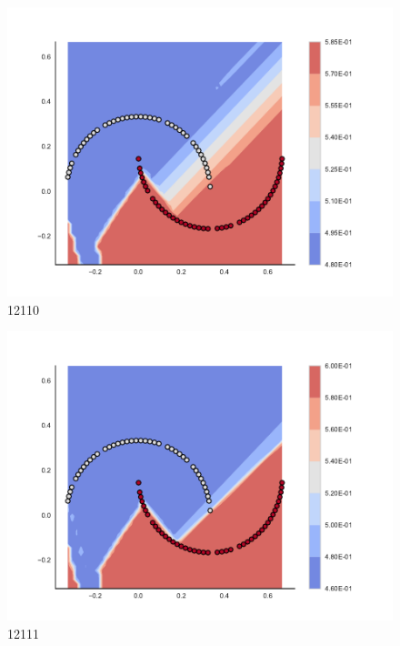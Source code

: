 \begin{subfigure}[b]{0.09\textwidth}
    \includegraphics[clip, trim=2.35cm 1.75cm 4.5cm 0cm,width=\textwidth]{img/convergence/12110.pdf}
    \caption{12110}
    \label{fig:convergence_12110}
\end{subfigure}
%
\begin{subfigure}[b]{0.09\textwidth}
    \includegraphics[clip, trim=2.35cm 1.75cm 4.5cm 0cm,width=\textwidth]{img/convergence/12111.pdf}
    \caption{12111}
    \label{fig:convergence_12111}
\end{subfigure}
%
